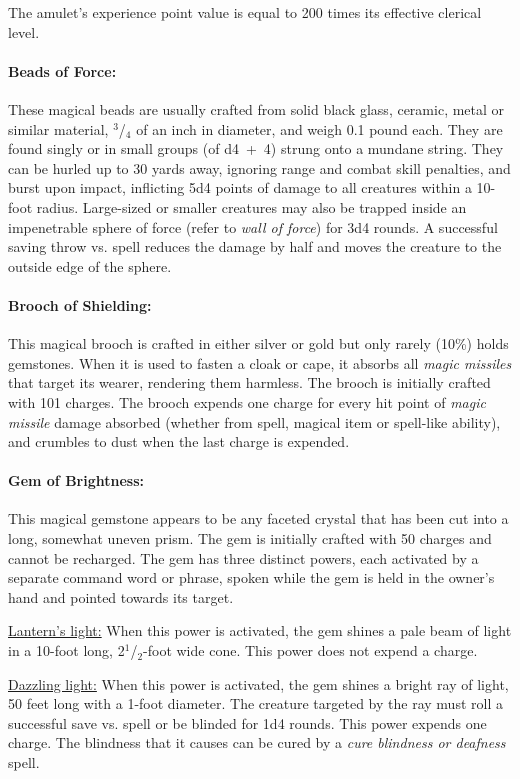 \begin{multicols}{2}
The amulet's experience point value is equal to 200 times its effective clerical level.

\paragraph{Beads of Force:} These magical beads are usually crafted from solid black glass, ceramic, metal or similar material, $^3$/$_4$ of an inch in diameter, and weigh 0.1 pound each.  They are found singly or in small groups (of d4~+~4) strung onto a mundane string.  They can be hurled up to 30 yards away, ignoring range and combat skill penalties, and burst upon impact, inflicting 5d4 points of damage to all creatures within a 10-foot radius.  Large-sized or smaller creatures may also be trapped inside an impenetrable sphere of force (refer to \textit{wall of force}) for 3d4 rounds.  A successful saving throw vs. spell reduces the damage by half and moves the creature to the outside edge of the sphere.

\paragraph{Brooch of Shielding:} This magical brooch is crafted in either silver or gold but only rarely (10\%) holds gemstones.  When it is used to fasten a cloak or cape, it absorbs all \textit{magic missiles} that target its wearer, rendering them harmless.  The brooch is initially crafted with 101 charges.  The brooch expends one charge for every hit point of \textit{magic missile} damage absorbed (whether from spell, magical item or spell-like ability), and crumbles to dust when the last charge is expended.

\paragraph{Gem of Brightness:} This magical gemstone appears to be any faceted crystal that has been cut into a long, somewhat uneven prism.  The gem is initially crafted with 50 charges and cannot be recharged.  The gem has three distinct powers, each activated by a separate command word or phrase, spoken while the gem is held in the owner's hand and pointed towards its target.

\underline{Lantern's light:} When this power is activated, the gem shines a pale beam of light in a 10-foot long, 2$^1$/$_2$-foot wide cone.  This power does not expend a charge.

\underline{Dazzling light:} When this power is activated, the gem shines a bright ray of light, 50 feet long with a 1-foot diameter.  The creature targeted by the ray must roll a successful save vs. spell or be blinded for 1d4 rounds.  This power expends one charge.  The blindness that it causes can be cured by a \textit{cure blindness or deafness} spell.


\end{multicols}
